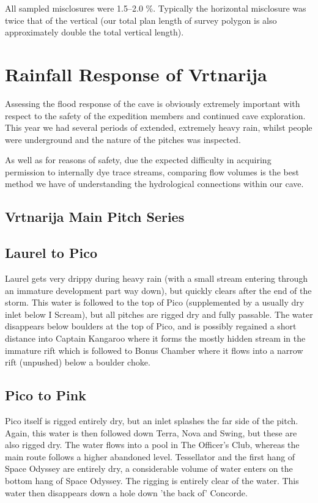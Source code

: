 All sampled misclosures were 1.5--2.0 \%. Typically the horizontal misclosure
was twice that of the vertical (our total plan length of survey polygon is also
approximately double the total vertical length).


\section{Rainfall Response of Vrtnarija}

Assessing the flood response of the cave is obviously extremely important
with respect to the safety of the expedition members and continued
cave exploration. This year we had several periods of extended, extremely
heavy rain, whilst people were underground and the nature of the pitches
was inspected.

As well as for reasons of safety, due the expected difficulty in acquiring
permission to internally dye trace streams, comparing flow volumes
is the best method we have of understanding the hydrological connections
within our cave.

\subsection{Vrtnarija Main Pitch Series}

\subsection{Laurel to Pico}

Laurel gets very drippy during heavy rain (with a small stream entering through
an immature development part way down), but quickly clears after the end of the
storm. This water is followed to the top of Pico (supplemented by a usually dry
inlet below I Scream), but all pitches are rigged dry and fully passable. 
The water disappears below boulders at the top of Pico, and is possibly
regained a short distance into Captain Kangaroo where it forms the mostly
hidden stream in the immature rift which is followed to Bonus Chamber where it
flows into a narrow rift (unpushed) below a boulder choke.

\subsection{Pico to Pink}

Pico itself is rigged entirely dry, but an inlet splashes the far side of the
pitch. Again, this water is then followed down Terra, Nova and Swing, but these
are also rigged dry. The water flows into a pool in The Officer's Club, whereas
the main route follows a higher abandoned level. Tessellator and the first hang
of Space Odyssey are entirely dry, a considerable volume of water enters on the
bottom hang of Space Odyssey. The rigging is entirely clear of the
water. This water then disappears down a hole down 'the back of' Concorde.

